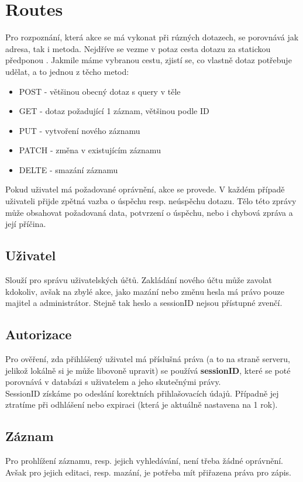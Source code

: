 \section{Routes}
Pro rozpoznání, která akce se má vykonat při rúzných dotazech, se porovnává
jak adresa, tak i metoda. Nejdříve se vezme v potaz cesta dotazu za
statickou předponou .
Jakmile máme vybranou cestu, zjistí se, co vlastně dotaz potřebuje udělat, a to jednou z těcho metod:
\begin{itemize}
     \item POST - většinou obecný dotaz s query v těle
     \item GET - dotaz požadující 1 záznam, většinou podle ID
     \item PUT - vytvoření nového záznamu
     \item PATCH - změna v existujícím záznamu
     \item DELTE - smazání záznamu
\end{itemize}
Pokud uživatel má požadované oprávnění, akce se provede. V každém případě
uživateli přijde zpětná vazba o úspěchu resp. neúspěchu dotazu. Tělo
této zprávy může obsahovat požadovaná data, potvrzení o úspěchu, nebo i
chybová zpráva a její příčina.


\subsection{Uživatel}
Slouží pro správu uživatelských účtů.
Zakládání nového účtu může zavolat kdokoliv, avšak na zbylé akce, jako
mazání nebo změnu hesla má právo pouze majitel a administrátor.
Stejně tak heslo a sessionID nejsou přístupné zvenčí.

\subsection{Autorizace}
Pro ověření, zda přihlášený uživatel má příslušná práva
(a to na straně serveru, jelikož lokálně si je může libovoně upravit) se používá
\textbf{sessionID}, které se poté porovnává v databázi s uživatelem a jeho skutečnými právy.\\
SessionID získáme po odeslání korektních přihlašovacích údajů.
Případně jej ztratíme při odhlášení nebo
expiraci (která je aktuálně nastavena na 1 rok).

\subsection{Záznam}
Pro prohlížení záznamu, resp. jejich vyhledávání, není třeba žádné oprávnění.
Avšak pro jejich editaci, resp. mazání,
je potřeba mít přiřazena práva pro zápis.

